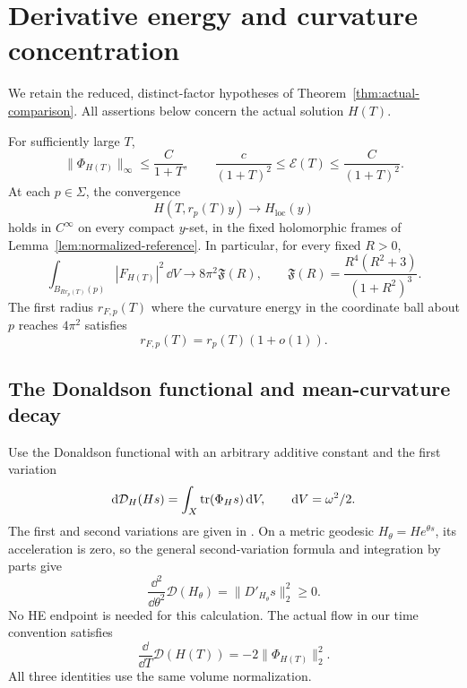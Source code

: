 \section{Derivative energy and curvature concentration}
\label{sec:energy-curvature}

We retain the reduced, distinct-factor hypotheses of
Theorem~\ref{thm:actual-comparison}. All assertions below
concern the actual solution \(H(T)\).

\begin{theorem}\label{thm:energy-curvature}
For sufficiently large \(T\),
\begin{equation}\label{eq:actual-energy-bounds}
 \|\Phi_{H(T)}\|_\infty\le\frac{C}{1+T},\qquad
 \frac{c}{(1+T)^2}\le\mathcal E(T)\le\frac{C}{(1+T)^2}.
\end{equation}
At each \(p\in\Sigma\), the convergence
\[
 H(T,r_p(T)y)\longrightarrow H_{\mathrm{loc}}(y)
\]
holds in \(C^\infty\) on every compact \(y\)-set, in the
fixed holomorphic frames of Lemma~\ref{lem:normalized-reference}.
In particular, for every fixed \(R>0\),
\begin{equation}\label{eq:actual-core-energy}
 \int_{B_{Rr_p(T)}(p)}|F_{H(T)}|^2\,\dd V
 \longrightarrow8\pi^2\mathfrak F(R),\qquad
 \mathfrak F(R)=\frac{R^4(R^2+3)}{(1+R^2)^3}.
\end{equation}
The first radius \(r_{F,p}(T)\) where the curvature energy
in the coordinate ball about \(p\) reaches \(4\pi^2\)
satisfies
\begin{equation}\label{eq:half-charge-radius}
 r_{F,p}(T)=r_p(T)(1+o(1)).
\end{equation}
\end{theorem}

\subsection{The Donaldson functional and mean-curvature decay}

Use the Donaldson functional with an arbitrary additive constant
and the first variation
\begin{equation}\label{eq:donaldson-variation}
 \mathrm d\mathcal D_H(Hs)=\int_X\operatorname{tr}(\Phi_Hs)\,\mathrm d V,
 \qquad \mathrm d V=\omega^2/2 .
\end{equation}
The first and second variations are given in
\cite[(6.3.27), (6.3.29)--(6.3.34)]{Kobayashi87}.
On a metric geodesic \(H_\theta=He^{\theta s}\), its
acceleration is zero, so the general second-variation
formula and integration by parts give
\begin{equation}\label{eq:donaldson-convexity}
 \frac{\dd^2}{\dd\theta^2}\mathcal D(H_\theta)
       =\|D'_{H_\theta}s\|_2^2\ge0 .
\end{equation}
No HE endpoint is needed for this calculation. The actual
flow in our time convention satisfies
\begin{equation}\label{eq:donaldson-dissipation}
 \frac{\dd}{\dd T}\mathcal D(H(T))
       =-2\|\Phi_{H(T)}\|_2^2.
\end{equation}
All three identities use the same volume normalization.

